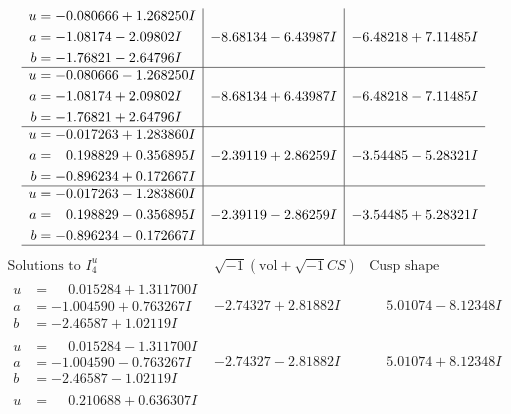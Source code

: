 \documentclass[1p]{elsarticle_modified}
\theoremstyle{definition}
\newcommand{\I}{\sqrt{-1}}
\begin{document}
$$\begin{array}{c|c|c}
\begin{aligned}
u &= -0.080666 + 1.268250 I \\
a &= -1.08174 - 2.09802 I \\
b &= -1.76821 - 2.64796 I\end{aligned}
 & -8.68134 - 6.43987 I & -6.48218 + 7.11485 I \\ \hline\begin{aligned}
u &= -0.080666 - 1.268250 I \\
a &= -1.08174 + 2.09802 I \\
b &= -1.76821 + 2.64796 I\end{aligned}
 & -8.68134 + 6.43987 I & -6.48218 - 7.11485 I \\ \hline\begin{aligned}
u &= -0.017263 + 1.283860 I \\
a &= \phantom{-}0.198829 + 0.356895 I \\
b &= -0.896234 + 0.172667 I\end{aligned}
 & -2.39119 + 2.86259 I & -3.54485 - 5.28321 I \\ \hline\begin{aligned}
u &= -0.017263 - 1.283860 I \\
a &= \phantom{-}0.198829 - 0.356895 I \\
b &= -0.896234 - 0.172667 I\end{aligned}
 & -2.39119 - 2.86259 I & -3.54485 + 5.28321 I\\
 \hline 
 \end{array}$$\newpage$$\begin{array}{c|c|c}  
\text{Solutions to }I^u_{4}& \I (\text{vol} + \sqrt{-1}CS) & \text{Cusp shape}\\
 \hline 
\begin{aligned}
u &= \phantom{-}0.015284 + 1.311700 I \\
a &= -1.004590 + 0.763267 I \\
b &= -2.46587 + 1.02119 I\end{aligned}
 & -2.74327 + 2.81882 I & \phantom{-}5.01074 - 8.12348 I \\ \hline\begin{aligned}
u &= \phantom{-}0.015284 - 1.311700 I \\
a &= -1.004590 - 0.763267 I \\
b &= -2.46587 - 1.02119 I\end{aligned}
 & -2.74327 - 2.81882 I & \phantom{-}5.01074 + 8.12348 I \\ \hline\begin{aligned}
u &= \phantom{-}0.210688 + 0.636307 I \\

\end{aligned}
\end{array}$$
\end{document}
